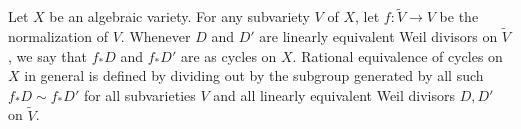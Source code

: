 Let $X$ be an algebraic variety. For any subvariety $V$ of $X$, let $f: \tilde{V} \to V$ be the normalization of $V$. Whenever $D$ and $D'$ are linearly equivalent Weil divisors on $\tilde{V}$, we say that $f_* D$ and $f_* D'$ are  as cycles on $X$. Rational equivalence of cycles on $X$ in general is defined by dividing out by the subgroup generated by all such $f_* D \sim f_* D'$ for all subvarieties $V$ and all linearly equivalent Weil divisors $D, D'$ on $\tilde{V}$.
